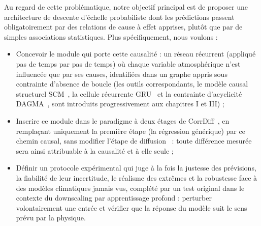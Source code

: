 \label{intro:obj}

Au regard de cette problématique, notre objectif principal est de proposer une architecture de descente d'échelle probabiliste dont les prédictions passent obligatoirement par des relations de cause à effet apprises, plutôt que par de simples associations statistiques. Plus spécifiquement, nous voulons :
\begin{itemize}[leftmargin=1.2em, itemsep=2pt]
    \item Concevoir le module qui porte cette causalité : un réseau récurrent (appliqué pas de temps par pas de temps) où chaque variable atmosphérique n'est influencée que par ses causes, identifiées dans un graphe appris sous contrainte d'absence de boucle (les outils correspondants, le modèle causal structurel SCM~\cite{pearl_causality_2009}, la cellule récurrente GRU~\cite{cho_gru_2014} et la contrainte d'acyclicité DAGMA~\cite{bello_dagma_2022}, sont introduits progressivement aux chapitres I et III) ;
    \item Inscrire ce module dans le paradigme à deux étages de CorrDiff~\cite{mardani_corrdiff_2023}, en remplaçant uniquement la première étape (la régression générique) par ce chemin causal, sans modifier l'étape de diffusion~\cite{karras_edm_2022} : toute différence mesurée sera ainsi attribuable à la causalité et à elle seule ;
    \item Définir un protocole expérimental qui juge à la fois la justesse des prévisions, la fiabilité de leur incertitude, le réalisme des extrêmes et la robustesse face à des modèles climatiques jamais vus, complété par un test original dans le contexte du downscaling par apprentissage profond : perturber volontairement une entrée et vérifier que la réponse du modèle suit le sens prévu par la physique.
\end{itemize}

\label{intro:contrib}

